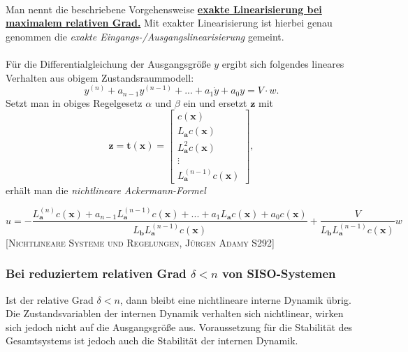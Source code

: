 			\leavevmode\\
			Man nennt die beschriebene Vorgehensweise \underline{\textbf{exakte Linearisierung bei maximalem relativen Grad.}} Mit exakter Linearisierung ist hierbei genau genommen die \textit{exakte Eingangs-/Ausgangslinearisierung} gemeint.\\\\
			Für die Differentialgleichung der Ausgangsgröße $ y $ ergibt sich folgendes lineares Verhalten aus obigem Zustandsraummodell:
			\[y^{(n)}+a_{n-1}y^{(n-1)} + ... + a_{1}\dot{y}+a_{0}y=V\cdot w.\]
			Setzt man in obiges Regelgesetz $ \alpha $ und $ \beta $ ein und ersetzt $ \bm{z} $ mit
			\[\bm{z}=\bm{t}(\bm{x})=\begin{bmatrix}c(\bm{x})\\L_{\bm{a}}c(\bm{x})\\L_{\bm{a}}^{2}c(\bm{x})\\\vdots\\ L_{\bm{a}}^{(n-1)}c(\bm{x})\end{bmatrix},\]
			erhält man die \textit{nichtlineare Ackermann-Formel}\\
			\begin{tcolorbox}[title=Definition: \textit{nichtlineare Ackermann-Formel}]
				\[u=-\dfrac{L_{\bm{a}}^{(n)}c(\bm{x})+a_{n-1}L_{\bm{a}}^{(n-1)}c(\bm{x})+...+a_{1}L_{\bm{a}}c(\bm{x})+a_{0}c(\bm{x})}{L_{\bm{b}}L_{\bm{a}}^{(n-1)}c(\bm{x})}+\dfrac{V}{L_{\bm{b}}L_{\bm{a}}^{(n-1)}c(\bm{x})}w\]
				[\textsc{Nichtlineare Systeme und Regelungen, Jürgen Adamy S292}]
			\end{tcolorbox}
		
		
		\subsubsection{Bei reduziertem relativen Grad $ \delta<n $ von SISO-Systemen}	
			Ist der relative Grad $ \delta < n $, dann bleibt eine nichtlineare interne Dynamik übrig. Die Zustandsvariablen der internen Dynamik verhalten sich nichtlinear, wirken sich jedoch nicht auf die Ausgangsgröße aus. Voraussetzung für die Stabilität des Gesamtsystems ist jedoch auch die Stabilität der internen Dynamik.\\	
